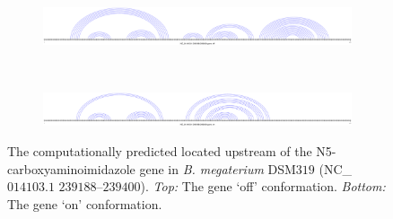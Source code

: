 \begin{figure}[!ht]
\centering
\begin{subfigure}[h]{\textwidth}
\centering
\includegraphics[width=.9\textwidth]{Figures/Ribofinder/NC_014103_1_239188_239400_OFF.pdf}
\end{subfigure} \\
\medskip
\begin{subfigure}[h]{\textwidth}
\centering
\includegraphics[width=.9\textwidth]{Figures/Ribofinder/NC_014103_1_239188_239400_ON.pdf}
\end{subfigure}
\caption[Structures for the putative \rb located upstream of the N5- carboxy\-amino\-imidazole gene in {\em B. megaterium} DSM$319$]{The computationally predicted \rb located upstream of the
N5- carboxy\-amino\-imidazole
gene in {\em B. megaterium} DSM$319$ (NC\_$014103.1$ $239188$--$239400$).
{\em Top:} The gene `off' conformation. {\em Bottom:} The gene `on' conformation.}
\label{fig:figure:NC_014103_1_239188_239400}
\end{figure}
